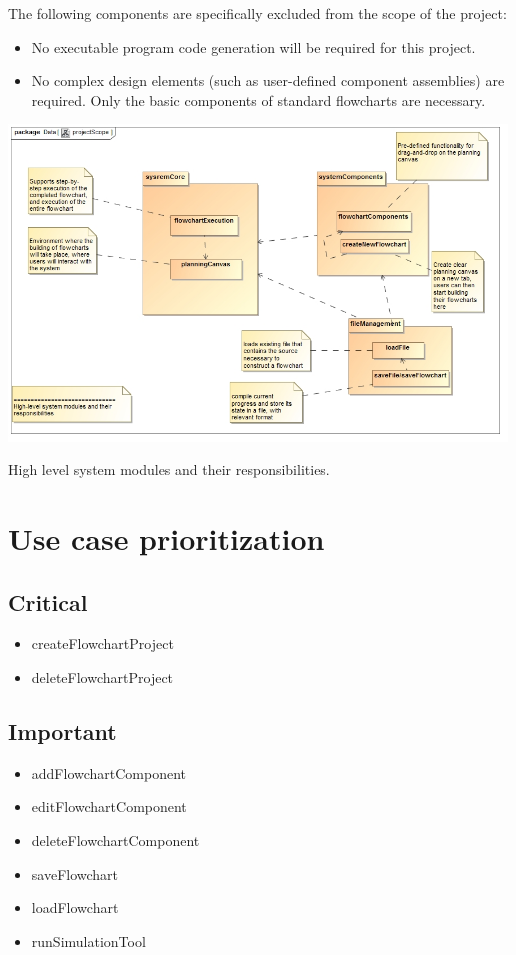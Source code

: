 \documentclass[11pt,a4paper,titlepage]{article}
\begin{document}
The following components are specifically excluded from the scope of the project:

\begin{itemize}
\item No executable program code generation will be required for this project.
\item No complex design elements (such as user-defined component assemblies) are required.
Only the basic components of standard flowcharts are necessary.\\

\end{itemize}

\includegraphics[width=500px]{projectScope.jpg}
\centerline{High level system modules and their responsibilities.}


\newpage	
\section{Use case prioritization}
\subsection{Critical}
\begin{itemize}
  \item createFlowchartProject
  \item deleteFlowchartProject
\end{itemize}
\subsection{Important}
\begin{itemize}
  \item addFlowchartComponent
  \item editFlowchartComponent
  \item deleteFlowchartComponent
  \item saveFlowchart
  \item loadFlowchart
  \item runSimulationTool
\end{itemize}
\end{document}
